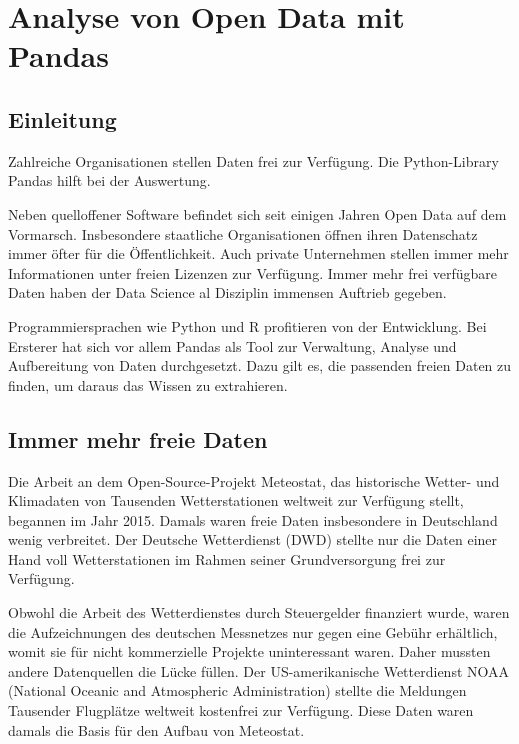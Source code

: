 %
%
%
%




\chapter{Analyse von Open Data mit Pandas}

\section{Einleitung}

Zahlreiche Organisationen stellen Daten frei zur Verfügung. Die Python-Library Pandas hilft bei der Auswertung. 

Neben quelloffener Software befindet sich seit einigen Jahren Open Data auf dem Vormarsch. Insbesondere staatliche Organisationen öffnen ihren Datenschatz immer öfter für die Öffentlichkeit. Auch private Unternehmen stellen immer mehr Informationen unter freien Lizenzen zur Verfügung. Immer mehr frei verfügbare Daten haben der Data Science al Disziplin immensen Auftrieb gegeben.

Programmiersprachen wie Python und R profitieren von der Entwicklung. Bei Ersterer hat sich vor allem Pandas als Tool zur Verwaltung, Analyse und Aufbereitung von Daten durchgesetzt. Dazu gilt es, die passenden freien Daten zu finden, um daraus das Wissen zu extrahieren.

\section{Immer mehr freie Daten}

Die Arbeit an dem Open-Source-Projekt Meteostat, das historische Wetter- und Klimadaten von Tausenden Wetterstationen weltweit zur Verfügung stellt, begannen im Jahr 2015. Damals waren freie Daten insbesondere in Deutschland wenig verbreitet. Der Deutsche Wetterdienst (DWD) stellte nur die Daten einer Hand voll Wetterstationen im Rahmen seiner Grundversorgung frei zur Verfügung.

Obwohl die Arbeit des Wetterdienstes durch Steuergelder finanziert wurde, waren die Aufzeichnungen des deutschen Messnetzes nur gegen eine Gebühr erhältlich, womit sie für nicht kommerzielle Projekte uninteressant waren. Daher mussten andere Datenquellen die Lücke füllen. Der US-amerikanische Wetterdienst NOAA (National Oceanic and Atmospheric Administration) stellte die Meldungen Tausender Flugplätze weltweit kostenfrei zur Verfügung. Diese Daten waren damals die Basis für den Aufbau von Meteostat.


